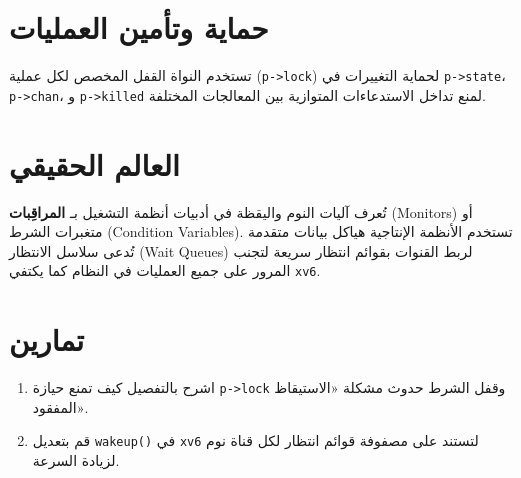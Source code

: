 \section{حماية وتأمين العمليات}
\label{sec:process_locking}

تستخدم النواة القفل المخصص لكل عملية (\texttt{p->lock}) لحماية التغييرات في \texttt{p->state}، \texttt{p->chan}، و \texttt{p->killed} لمنع تداخل الاستدعاءات المتوازية بين المعالجات المختلفة.

\section{العالم الحقيقي}
\label{sec:real_world_sleep}

تُعرف آليات النوم واليقظة في أدبيات أنظمة التشغيل بـ \textbf{المراقِبات} (Monitors) أو متغبرات الشرط (Condition Variables).
تستخدم الأنظمة الإنتاجية هياكل بيانات متقدمة تُدعى سلاسل الانتظار (Wait Queues) لربط القنوات بقوائم انتظار سريعة لتجنب المرور على جميع العمليات في النظام كما يكتفي \texttt{xv6}.

\section{تمارين}
\label{sec:exercises_sleep}

\begin{enumerate}
  \item اشرح بالتفصيل كيف تمنع حيازة \texttt{p->lock} وقفل الشرط حدوث مشكلة «الاستيقاظ المفقود».
  \item قم بتعديل \texttt{wakeup()} في \texttt{xv6} لتستند على مصفوفة قوائم انتظار لكل قناة نوم لزيادة السرعة.
\end{enumerate}
